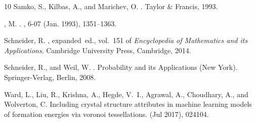 \documentclass[11pt,a4paper]{article}
\theoremstyle{plain}
\theoremstyle{definition}
\theoremstyle{remark}
\begin{document}
\begin{thebibliography}{10}
{\sc Samko, S., Kilbas, A., and Marichev, O.}
.
\newblock Taylor \& Francis, 1993.

{, M.}
.
, 6-07 (Jan. 1993),
    1351--1363.

{\sc Schneider, R.}
, expanded~ed.,
    vol.~151 of {\em Encyclopedia of Mathematics and its Applications}.
\newblock Cambridge University Press, Cambridge, 2014.

{\sc Schneider, R., and Weil, W.}
.
\newblock Probability and its Applications (New York). Springer-Verlag, Berlin,
    2008.

{\sc Ward, L., Liu, R., Krishna, A., Hegde, V.~I., Agrawal, A., Choudhary, A.,
    and Wolverton, C.}
\newblock Including crystal structure attributes in machine learning models of
    formation energies via voronoi tessellations.
 (Jul 2017), 024104.

\end{thebibliography}
\end{document}
